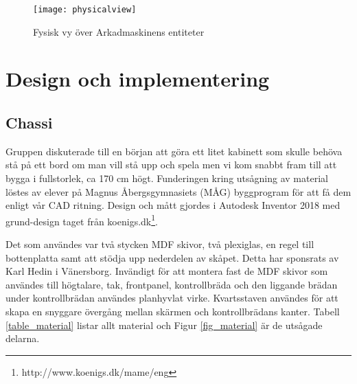 \documentclass[12pt,fleqn,openany]{book} %
\begin{document}
\begin{figure}[!h]
\centering\texttt{[image: physicalview]}
\caption{Fysisk vy över Arkadmaskinens entiteter}
\label{fig_physview}
\end{figure}


\chapter{Design och implementering}
\section{Chassi}
Gruppen diskuterade till en början att göra ett litet kabinett som skulle behöva stå på ett bord om man vill stå upp och
spela men vi kom snabbt fram till att bygga i fullstorlek, ca 170 cm högt. Funderingen kring utsågning av material löstes av elever
på Magnus Åbergsgymnasiets (MÅG) byggprogram för att få dem enligt vår CAD ritning. Design och mått gjordes i Autodesk Inventor 
2018 med grund-design taget från koenigs.dk\footnote{http://www.koenigs.dk/mame/eng}.

Det som användes var två stycken MDF skivor, två plexiglas, en regel till bottenplatta samt att stödja upp nederdelen av skåpet. 
Detta har sponsrats av Karl Hedin i Vänersborg. Invändigt för att montera fast de MDF skivor som användes till högtalare, tak, 
frontpanel, kontrollbräda och den liggande brädan under kontrollbrädan användes planhyvlat virke. Kvartsstaven användes för att 
skapa en snyggare övergång mellan skärmen och kontrollbrädans kanter. Tabell \ref{table_material} listar allt material och Figur \ref{fig_material} är de utsågade delarna.

\begin{table}[h]
\centering
\caption{Material som användes}\vspace*{0.2cm}
\label{table_material}
\end{table}
\end{document}
